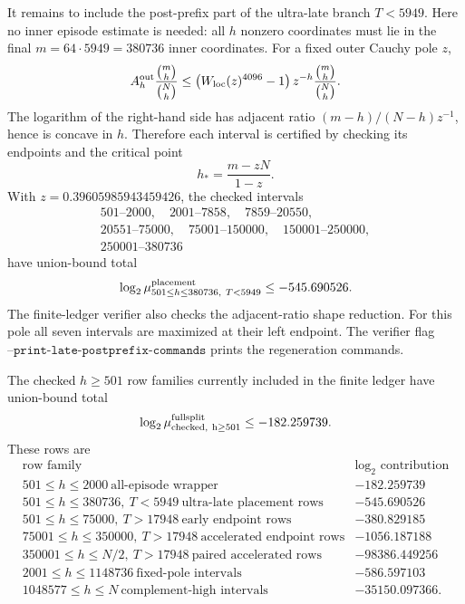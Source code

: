 It remains to include the post-prefix part of the ultra-late branch \(T<5949\).  Here no inner episode estimate is
needed: all \(h\) nonzero coordinates must lie in the final \(m=64\cdot5949=380736\) inner coordinates.  For a fixed
outer Cauchy pole \(z\),
\[
A_h^{\rm out}\frac{\binom{m}{h}}{\binom Nh}
\le
\left(W_{\rm loc}(z)^{4096}-1\right)z^{-h}\frac{\binom{m}{h}}{\binom Nh}.
\]
The logarithm of the right-hand side has adjacent ratio \((m-h)/(N-h)z^{-1}\), hence is concave in \(h\).  Therefore
each interval is certified by checking its endpoints and the critical point
\[
h_*=\frac{m-zN}{1-z}.
\]
With \(z=0.39605985943459426\), the checked intervals
\[
\begin{array}{c}
501\text{--}2000,\quad 2001\text{--}7858,\quad 7859\text{--}20550,\\
20551\text{--}75000,\quad 75001\text{--}150000,\quad 150001\text{--}250000,\\
250001\text{--}380736
\end{array}
\]
have union-bound total
\[
\log_2\mu_{501\le h\le380736,\ T<5949}^{\rm placement}\le -545.690526.
\]
The finite-ledger verifier also checks the adjacent-ratio shape reduction.  For this pole all seven intervals are
maximized at their left endpoint.  The verifier flag \(\texttt{--print-late-postprefix-commands}\) prints the
regeneration commands.

\begin{corollary}
\label{cor:fullsplit-postprefix-checked-ledger}
The checked \(h\ge501\) row families currently included in the finite ledger have union-bound total
\[
\log_2\mu_{\rm checked,\ h\ge501}^{\rm fullsplit}\le -182.259739.
\]
These rows are
\[
\begin{array}{c|c}
\text{row family} & \log_2\text{ contribution}\\
\hline
501\le h\le2000\ \text{all-episode wrapper} & -182.259739\\
501\le h\le380736,\ T<5949\ \text{ultra-late placement rows} & -545.690526\\
501\le h\le75000,\ T>17948\ \text{early endpoint rows} & -380.829185\\
75001\le h\le350000,\ T>17948\ \text{accelerated endpoint rows} & -1056.187188\\
350001\le h\le N/2,\ T>17948\ \text{paired accelerated rows} & -98386.449256\\
2001\le h\le1148736\ \text{fixed-pole intervals} & -586.597103\\
1048577\le h\le N\ \text{complement-high intervals} & -35150.097366 .
\end{array}
\]
\end{corollary}

